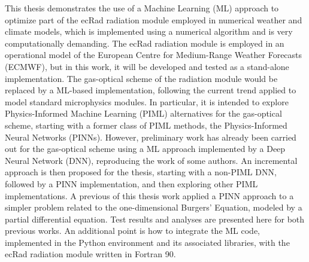 \begin{resumo}


This thesis demonstrates the use of a Machine Learning (ML) approach to optimize part of the ecRad radiation module employed in numerical weather and climate models, which is implemented using a numerical algorithm and is very computationally demanding. The ecRad radiation module is employed in an operational model of the European Centre for Medium-Range Weather Forecasts (ECMWF), but in this work, it will be developed and tested as a stand-alone implementation. The gas-optical scheme of the radiation module would be replaced by a ML-based implementation, following the current trend applied to model standard microphysics modules. In particular, it is intended to explore Physics-Informed Machine Learning (PIML) alternatives for the gas-optical scheme, starting with a former class of PIML methods, the Physics-Informed Neural Networks (PINNs). However, preliminary work has already been carried out for the gas-optical scheme using a ML approach implemented by a Deep Neural Network (DNN), reproducing the work of some authors. An incremental approach is then proposed for the thesis, starting with a non-PIML DNN, followed by a PINN implementation, and then exploring other PIML implementations. A previous of this thesis work applied a PINN approach to a simpler problem related to the one-dimensional Burgers' Equation, modeled by a partial differential equation. Test results and analyses are presented here for both previous works. An additional point is how to integrate the ML code, implemented in the Python environment and its associated libraries, with the ecRad radiation module written in Fortran 90.




 
\end{resumo}